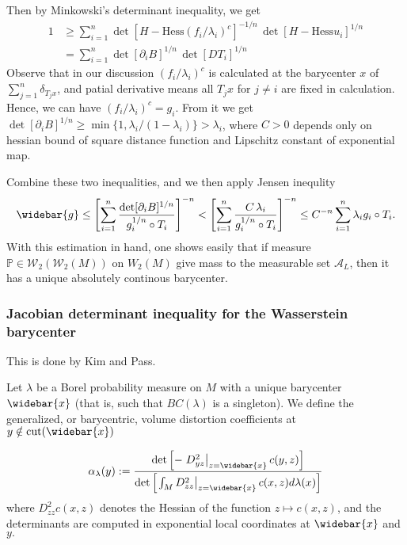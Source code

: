 Then by Minkowski's determinant inequality, we get
\begin{align*}
	1 & \geq \sum_{i=1}^{n} \det [H-\text{Hess}(f_i/\lambda_i)^c]^{-1/n}\,\det[H-\text{Hess}u_i]^{1/n} \\
	  & =\sum_{i=1}^n \det[\partial_i B]^{1/n}\,\det[DT_i]^{1/n}
\end{align*}
Observe that in our discussion $(f_i / \lambda_i)^c$ is calculated at the barycenter $x$ of $\sum_{j=1}^{n} \delta_{T_j x}$,
and patial derivative means all $T_j x$ for $ j \ne i$ are fixed in calculation.
Hence, we can have $(f_i / \lambda_i)^c = g_i$.
From it we get $\det[\partial_i B]^{1/n} \geq \min \{1, \lambda_i / (1 - \lambda_i)\} > \lambda_i$,
where $C > 0$ depends only on hessian bound of square distance function and Lipschitz constant of exponential map.

Combine these two inequalities, and we then apply Jensen inequlity
\[
	\widebar{g} \leq
	\left[ \sum_{i=1}^n \frac{\det[\partial_i B]^{1/n}}
	{g_i^{1/n} \circ T_i}\right]^{-n}
	< \left[ \sum_{i=1}^n \frac{C \, \lambda_i}
	{g_i^{1/n} \circ T_i}\right]^{-n}
	\leq C^{-n} \sum_{i=1}^n \lambda_i g_i \circ T_i.
\]
With this estimation in hand,
one shows easily that if measure $\mathbb{P} \in \mathcal{W}_2(\mathcal{W}_2(M))$ on $W_2(M)$ give mass to the measurable set $\mathcal{A}_L$,
then it has a unique absolutely continous barycenter.

\subsubsection{Jacobian determinant inequality for the Wasserstein barycenter}

This is done by Kim and Pass.
\begin{defn}
	Let \( \lambda \) be a Borel probability measure on \( M \) with a
	unique barycenter \( \widebar { x } \) (that is, such that \( B C ( \lambda ) \) is a singleton). We define the generalized,
	or barycentric, volume distortion coefficients at \( y \notin \operatorname { cut } ( \widebar { x } ) \)

	\[ \alpha _ { \lambda } ( y ) : = \frac { \operatorname { det } \left[ - \left. D _ { y z } ^ { 2 } \right| _ { z = \widebar { x } } c ( y , z ) \right] } { \operatorname { det } \left[ \left. \int _ { M } D _ { z z } ^ { 2 } \right| _ { z = \widebar { x } } c ( x , z ) d \lambda ( x ) \right] } \]
	where \( D _ { z z } ^ { 2 } c ( x , z ) \) denotes the Hessian of the function \( z \mapsto c ( x , z ) \), and the determinants
	are computed in exponential local coordinates at \( \widebar { x } \) and \( y . \)
\end{defn}

